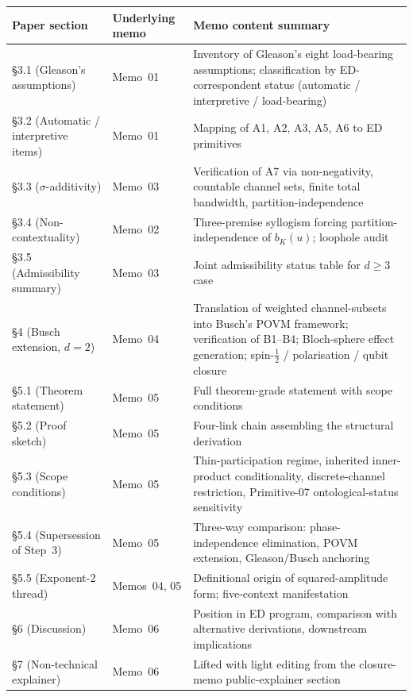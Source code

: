\documentclass[11pt,a4paper]{article}
\begin{document}
\begin{center}
\begin{tabular}{p{4.2cm}p{2.2cm}p{7.5cm}}
\hline
Paper section & Underlying memo & Memo content summary \\
\hline
\S 3.1 (Gleason's assumptions) & Memo~01 & Inventory of Gleason's eight load-bearing assumptions; classification by ED-correspondent status (automatic / interpretive / load-bearing) \\
\S 3.2 (Automatic / interpretive items) & Memo~01 & Mapping of A1, A2, A3, A5, A6 to ED primitives \\
\S 3.3 ($\sigma$-additivity) & Memo~03 & Verification of A7 via non-negativity, countable channel sets, finite total bandwidth, partition-independence \\
\S 3.4 (Non-contextuality) & Memo~02 & Three-premise syllogism forcing partition-independence of $b_K(u)$; loophole audit \\
\S 3.5 (Admissibility summary) & Memo~03 & Joint admissibility status table for $d \geq 3$ case \\
\S 4 (Busch extension, $d = 2$) & Memo~04 & Translation of weighted channel-subsets into Busch's POVM framework; verification of B1--B4; Bloch-sphere effect generation; spin-$\tfrac{1}{2}$ / polarisation / qubit closure \\
\S 5.1 (Theorem statement) & Memo~05 & Full theorem-grade statement with scope conditions \\
\S 5.2 (Proof sketch) & Memo~05 & Four-link chain assembling the structural derivation \\
\S 5.3 (Scope conditions) & Memo~05 & Thin-participation regime, inherited inner-product conditionality, discrete-channel restriction, Primitive-07 ontological-status sensitivity \\
\S 5.4 (Supersession of Step~3) & Memo~05 & Three-way comparison: phase-independence elimination, POVM extension, Gleason/Busch anchoring \\
\S 5.5 (Exponent-2 thread) & Memos~04, 05 & Definitional origin of squared-amplitude form; five-context manifestation \\
\S 6 (Discussion) & Memo~06 & Position in ED program, comparison with alternative derivations, downstream implications \\
\S 7 (Non-technical explainer) & Memo~06 & Lifted with light editing from the closure-memo public-explainer section \\
\hline
\end{tabular}
\end{center}
\end{document}
